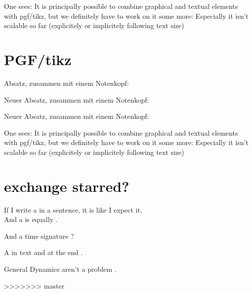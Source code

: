 \documentclass{scrartcl}
\begin{document}
One sees: It is principally possible to combine graphical and textual elements with pgf/tikz,
but we definitely have to work on it some more: Especially it isn't scalable so far (explicitely or implicitely following text size)

	
\section*{PGF/tikz}

Absatz, zusammen mit einem Notenkopf: 

\Large
Neuer Absatz, zusammen mit einem Notenkopf: 

\normalsize
Neuer Absatz, zusammen mit einem Notenkopf: 

One sees: It is principally possible to combine graphical and textual elements with pgf/tikz,
but we definitely have to work on it some more: Especially it isn't scalable so far (explicitely or implicitely following text size)

\section*{exchange starred?}

If I write a \flat in a sentence, it is like I expect it.\\
And a \lilyRFZ is equally \lilyRF.

And a time signature ?

A \lilyRFZ in text and at the end \lilyRFZ*.

General Dynamics  aren't a problem .


	
>>>>>>> master
\end{document}
